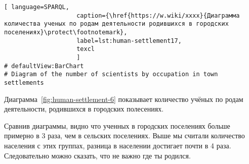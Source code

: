 \begin{lstlisting}[ language=SPARQL, 
                    caption={\href{https://w.wiki/xxxx}{Диаграмма количества ученых по родам деятельности родившихся в городских поселениях}\protect\footnotemark},
                    label=lst:human-settlement17,
                    texcl 
                    ]
# defaultView:BarChart
# Diagram of the number of scientists by occupation in town settlements

\end{lstlisting}%

Диаграмма~\ref{fig:human-settlement-6} показывает количество учёных по родам деятельности, родившихся в городских полесениях.

\begin{figure*}
    \setlength{\fboxsep}{0pt}%
    \setlength{\fboxrule}{1pt}%
	\label{fig:human-settlement-6}
	\caption[Диаграмма количества ученых по родам деятельности родившихся в городских поселениях.]{Диаграмма количества ученых по родам деятельности родившихся в городских поселениях. Ссылка на SPARQL-запрос: \href{https://w.wiki/xxxx}{https://w.wiki/xxxx}}%
\end{figure*} 

Сравнив диаграммы, видно что ученных в городских поселениях больше примерно в 3 раза, чем в сельских поселениях. Выше мы считали количество населения с этих группах, разница в населении достигает почти в 4 раза. Следовательно можно сказать, что не важно где ты родился. 
